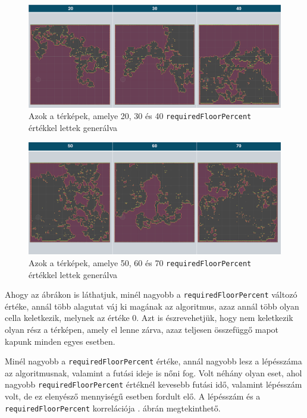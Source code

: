 \begin{figure}[ht]
\centering
\includegraphics[width = \textwidth]{images/lowpercentrandomwalk.png}
\caption{Azok a térképek, amelye 20, 30 és 40 \texttt{requiredFloorPercent} értékkel lettek generálva}
\label{fig:lowpercentrandomwalk}
\end{figure}

\begin{figure}[ht]
\centering
\includegraphics[width = \textwidth]{images/highpercentrandomwalk.png}
\caption{Azok a térképek, amelye 50, 60 és 70 \texttt{requiredFloorPercent} értékkel lettek generálva}
\label{fig:highpercentrandomwalk}
\end{figure}

\newpage
Ahogy az ábrákon is láthatjuk, minél nagyobb a \texttt{requiredFloorPercent} változó értéke, annál több alagutat váj ki magának az algoritmus, azaz annál több olyan cella keletkezik, melynek az értéke 0. Azt is észrevehetjük, hogy nem keletkezik olyan rész a térképen, amely el lenne zárva, azaz teljesen összefüggő mapot kapunk minden egyes esetben.

Minél nagyobb a \texttt{requiredFloorPercent} értéke, annál nagyobb lesz a lépésszáma az algoritmusnak, valamint a futási ideje is nőni fog. Volt néhány olyan eset, ahol nagyobb \texttt{requiredFloorPercent} értéknél kevesebb futási idő, valamint lépésszám volt, de ez elenyésző mennyiségű esetben fordult elő. A lépésszám és a \texttt{requiredFloorPercent} korrelációja . ábrán megtekinthető.

